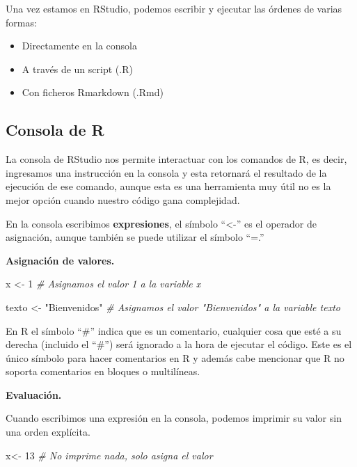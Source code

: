 \documentclass[
  12pt,
]{book}
\newenvironment{Shaded}{\begin{snugshade}}{\end{snugshade}}
\newcommand{\CommentTok}[1]{\textcolor[rgb]{0.56,0.35,0.01}{\textit{#1}}}
\newcommand{\DecValTok}[1]{\textcolor[rgb]{0.00,0.00,0.81}{#1}}
\newcommand{\NormalTok}[1]{#1}
\newcommand{\OtherTok}[1]{\textcolor[rgb]{0.56,0.35,0.01}{#1}}
\newcommand{\StringTok}[1]{\textcolor[rgb]{0.31,0.60,0.02}{#1}}
\providecommand{\tightlist}{%
  \setlength{\itemsep}{0pt}\setlength{\parskip}{0pt}}
\begin{document}
Una vez estamos en RStudio, podemos escribir y ejecutar las órdenes de varias formas:

\begin{itemize}
\tightlist
\item
  Directamente en la consola
\item
  A través de un script (.R)
\item
  Con ficheros Rmarkdown (.Rmd)
\end{itemize}

\hypertarget{consola-de-r}{%
\subsection{\texorpdfstring{\textbf{Consola de R}}{Consola de R}}\label{consola-de-r}}

La consola de RStudio nos permite interactuar con los comandos de R, es decir, ingresamos una instrucción en la consola y esta retornará el resultado de la ejecución de ese comando, aunque esta es una herramienta muy útil no es la mejor opción cuando nuestro código gana complejidad.

En la consola escribimos \textbf{expresiones}, el símbolo ``\textless-'' es el operador de asignación, aunque también se puede utilizar el símbolo ``=.''

\textbf{Asignación de valores.}

\begin{Shaded}
\begin{Highlighting}[]
\NormalTok{x }\OtherTok{\textless{}{-}} \DecValTok{1}  \CommentTok{\# Asignamos el valor 1 a la variable x}

\NormalTok{texto }\OtherTok{\textless{}{-}} \StringTok{"Bienvenidos"}  \CommentTok{\# Asignamos el valor "Bienvenidos" a la variable texto}
\end{Highlighting}
\end{Shaded}

En R el símbolo ``\#'' indica que es un comentario, cualquier cosa que esté a su derecha (incluido el ``\#'') será ignorado a la hora de ejecutar el código. Este es el único símbolo para hacer comentarios en R y además cabe mencionar que R no soporta comentarios en bloques o multilíneas.

\textbf{Evaluación.}

Cuando escribimos una expresión en la consola, podemos imprimir su valor sin una orden explícita.

\begin{Shaded}
\begin{Highlighting}[]
\NormalTok{x}\OtherTok{\textless{}{-}} \DecValTok{13} \CommentTok{\# No imprime nada, solo asigna el valor}
\end{Highlighting}
\end{Shaded}
\end{document}
